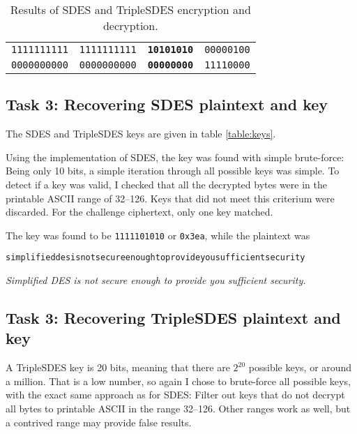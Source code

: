 \documentclass[a4paper,english,12pt]{article}
\begin{document}
\begin{table}
\begin{tabular}{@{}llll@{}}
            \texttt{1111111111} &
            \texttt{1111111111} &
      \texttt{\textbf{10101010}} &
              \texttt{00000100} \\

            \texttt{0000000000} &
            \texttt{0000000000} &
      \texttt{\textbf{00000000}} &
              \texttt{11110000} \\
    \bottomrule
  \end{tabular}
  \caption{Results of SDES and TripleSDES encryption and decryption.}
  \label{table:sdes}
\end{table}

\subsection{Task 3: Recovering SDES plaintext and key}

The SDES and TripleSDES keys are given in table \vref{table:keys}.

Using the implementation of SDES, the key was found with simple brute-force:
Being only 10 bits, a simple iteration through all possible keys was simple.
To detect if a key was valid, I checked that all the decrypted bytes were in
the printable ASCII range of 32--126. Keys that did not meet this criterium
were discarded. For the challenge ciphertext, only one key matched.

The key was found to be \texttt{1111101010} or \texttt{0x3ea}, while the
plaintext was
\begin{verbatim}
simplifieddesisnotsecureenoughtoprovideyousufficientsecurity
\end{verbatim}
\begin{center}
\textit{Simplified DES is not secure enough to provide you sufficient security.}
\end{center}

\subsection{Task 3: Recovering TripleSDES plaintext and key}

A TripleSDES key is 20 bits, meaning that there are $2^{20}$ possible keys, or
around a million. That is a low number, so again I chose to brute-force all
possible keys, with the exact same approach as for SDES: Filter out keys that
do not decrypt all bytes to printable ASCII in the range 32--126. Other ranges
work as well, but a contrived range may provide false results.
\end{document}
